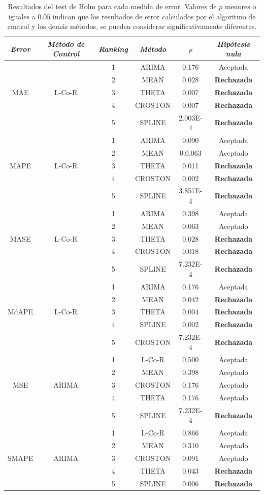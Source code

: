 \documentclass[runningheads]{llncs}
\begin{document}
\begin{table}[!htp]\footnotesize
\begin{center}
\begin{tabular}{|cccccc|}
\hline
\emph{Error}&\emph{Método de Control}&\emph{Ranking}&
\emph{Método}&$p$& \emph{Hipótesis nula}\\
\hline
&&1&ARIMA&0.176&Aceptada\\
&&2&MEAN&0.028& \textbf{Rechazada}\\
MAE&L-Co-R&3&THETA&0.007& \textbf{Rechazada}\\
&&4&CROSTON&0.007& \textbf{Rechazada}\\
&&5&SPLINE&2.003E-4& \textbf{Rechazada}\\
\hline
&&1&ARIMA&0.090& Aceptada\\
&&2&MEAN&0.0.063& Aceptado \\
MAPE&L-Co-R&3&THETA&0.011& \textbf{Rechazada}\\
&&4&CROSTON&0.002& \textbf{Rechazada}\\
&&5&SPLINE&3.857E-4& \textbf{Rechazada}\\
\hline
&&1&ARIMA&0.398& Aceptada\\
&&2&MEAN&0.063& Aceptado \\
MASE&L-Co-R&3&THETA&0.028& \textbf{Rechazada}\\
&&4&CROSTON&0.018& \textbf{Rechazada}\\
&&5&SPLINE&7.232E-4& \textbf{Rechazada}\\
\hline
&&1&ARIMA&0.176&Aceptada\\
&&2&MEAN&0.042& \textbf{Rechazada}\\
MdAPE&L-Co-R&3&THETA&0.004& \textbf{Rechazada}\\
&&4&SPLINE&0.002& \textbf{Rechazada}\\
&&5&CROSTON&7.232E-4& \textbf{Rechazada}\\
\hline
&&1&L-Co-R&0.500&Aceptada\\
&&2&MEAN&0.398& Aceptado \\
MSE&ARIMA&3&CROSTON&0.176& Aceptado \\
&&4&THETA&0.176& Aceptado \\
&&5&SPLINE&7.232E-4& \textbf{Rechazada}\\
\hline
&&1&L-Co-R&0.866& Aceptada\\
&&2&MEAN&0.310& Aceptado \\
SMAPE&ARIMA&3&CROSTON&0.091 & Aceptado \\
&&4&THETA&0.043& \textbf{Rechazada}\\
&&5&SPLINE&0.006& \textbf{Rechazada}\\
\hline
\end{tabular}
\end{center}
\caption{Resultados del test de Holm para cada medida de error. Valores de $p$ menores o
iguales a $0.05$ indican que los resultados de error calculados por el algoritmo de control y los
demás métodos, se pueden considerar significativamente diferentes.
\label{tb:holm-all}}

\end{table}
\end{document}
